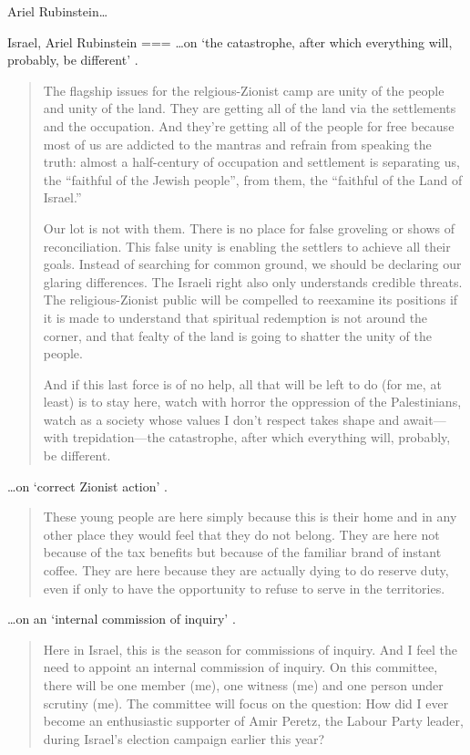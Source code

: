 Ariel Rubinstein…

Israel, Ariel Rubinstein
===
…on ‘the catastrophe, after which everything will, probably, be different’ \parencite{rubinstein2015a}.
\begin{quote}
    The flagship issues for the relgious-Zionist camp are unity of the people and unity of the land. They are getting all of the land via the settlements and the occupation. And they’re getting all of the people for free because most of us are addicted to the mantras and refrain from speaking the truth: almost a half-century of occupation and settlement is separating us, the “faithful of the Jewish people”, from them, the “faithful of the Land of Israel.”

    Our lot is not with them. There is no place for false groveling or shows of reconciliation. This false unity is enabling the settlers to achieve all their goals. Instead of searching for common ground, we should be declaring our glaring differences. The Israeli right also only understands credible threats. The religious-Zionist public will be compelled to reexamine its positions if it is made to understand that spiritual redemption is not around the corner, and that fealty of the land is going to shatter the unity of the people.

    And if this last force is of no help, all that will be left to do (for me, at least) is to stay here, watch with horror the oppression of the Palestinians, watch as a society whose values I don’t respect takes shape and await—with trepidation—the catastrophe, after which everything will, probably, be different.
\end{quote}

…on ‘correct Zionist action’ \parencite{rubinstein2010}.
\begin{quote}
    These young people are here simply because this is their home and in any other place they would feel that they do not belong. They are here not because of the tax benefits but because of the familiar brand of instant coffee. They are here because they are actually dying to do reserve duty, even if only to have the opportunity to refuse to serve in the territories.
\end{quote}

…on an ‘internal commission of inquiry’ \parencite{rubinstein2006}.
\begin{quote}
    Here in Israel, this is the season for commissions of inquiry. And I feel the need to appoint an internal commission of inquiry. On this committee, there will be one member (me), one witness (me) and one person under scrutiny (me). The committee will focus on the question: How did I ever become an enthusiastic supporter of Amir Peretz, the Labour Party leader, during Israel’s election campaign earlier this year?
\end{quote}